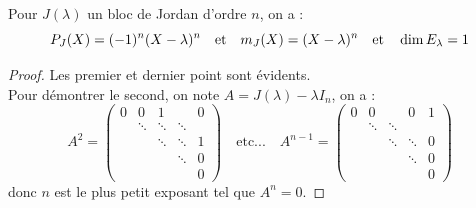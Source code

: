 \documentclass{article}
\begin{document}
\begin{prop}
\label{prop:blocJordan}
Pour $J(\lambda)$ un bloc de Jordan d'ordre $n$, on a :
\[ P_J(X) = (-1)^n(X-\lambda)^n \quad \text{et} \quad
m_J(X) = (X-\lambda)^n \quad \text{et} \quad
\dim{E_{\lambda}} = 1
\]
\end{prop}

\begin{proof}
Les premier et dernier point sont évidents. \\
Pour démontrer le second, on note $A = J(\lambda) - \lambda I_n$, on a :
\[ A^2 = 
\begin{pmatrix}
0 & 0 & 1 & & 0 \\
 & \ddots & \ddots & \ddots &  \\
 & & \ddots & \ddots & 1 \\
  & & & \ddots & 0 \\
  & & & & 0
\end{pmatrix} \quad \text{etc...} \quad A^{n-1} = 
\begin{pmatrix}
0 & 0 & & 0 & 1 \\
 & \ddots & \ddots & &  \\
 & & \ddots & \ddots & 0 \\
  & & & \ddots & 0 \\
   & & & & 0
\end{pmatrix} 
\]
donc $n$ est le plus petit exposant tel que $A^n=0$.
\end{proof}
\end{document}
